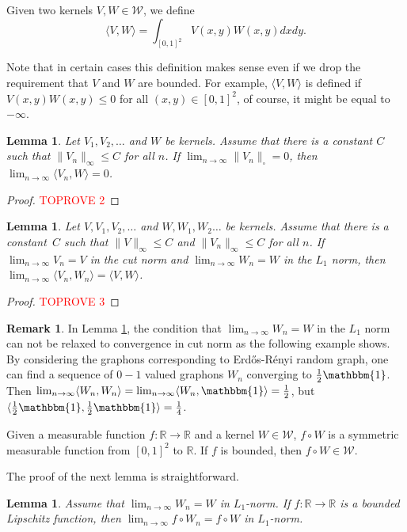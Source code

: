 \documentclass[11pt,a4paper]{article}
\theoremstyle{plain}
\newtheorem{lemma}[theorem]{Lemma}
\theoremstyle{definition}
\newtheorem{remark}[theorem]{Remark}
\begin{document}
Given two kernels $V,W\in\mathcal{W}$, we define
\[\langle V,W\rangle=\int_{[0,1]^2} V(x,y)W(x,y) dxdy.\]

Note that in certain cases this definition makes sense even if we drop the requirement that $V$ and $W$ are bounded. For example, $\langle V,W\rangle$ is defined if $V(x,y)W(x,y)\le 0$ for all $(x,y)\in [0,1]^2$, of course, it might be equal to $-\infty$.

\begin{lemma}\label{lemmaangle0}
    Let $V_1,V_2,\dots$ and $W$ be kernels. Assume that there is a constant $C$ such that   $\|V_n\|_\infty\le C$ for all $n$. If $\lim_{n\to\infty} \|V_n\|_\square=0$, then $\lim_{n\to\infty} \langle V_n,W\rangle =0$.
\end{lemma}
\begin{proof}\textcolor{red}{TOPROVE 2}\end{proof}


\begin{lemma}\label{lemmaangle}
    Let $V,V_1,V_2,\dots$ and $W,W_1,W_2\dots$ be kernels. Assume that there is a constant~$C$ such that $\|V\|_\infty\le C$ and   $\|V_n\|_\infty\le C$ for all $n$. If $\lim_{n\to\infty} V_n=V$ in the cut norm and $\lim_{n\to\infty} W_n=W$ in the $L_1$ norm, then $\lim_{n\to\infty} \langle V_n,W_n\rangle =\langle V,W\rangle$.
\end{lemma}
\begin{proof}\textcolor{red}{TOPROVE 3}\end{proof}
\begin{remark}
    In Lemma \ref{lemmaangle}, the condition that $\lim_{n\to\infty} W_n=W$ in the $L_1$ norm can not be relaxed to convergence in cut norm as the following example shows. By considering the graphons corresponding to Erd\H{o}s-R\'enyi random graph, one can find a sequence of $0-1$ valued graphons $W_n$ converging to $\frac{1}2\mathbbm{1}$. Then $\lim_{n\to\infty}\langle W_n,W_n\rangle=\lim_{n\to\infty}\langle W_n,\mathbbm{1}\rangle=\frac{1}2$, but $\langle \frac{1}2\mathbbm{1},\frac{1}2\mathbbm{1}\rangle=\frac{1}4$.
\end{remark}

Given a measurable function $f:\mathbb{R}\to\mathbb{R}$ and a kernel $W\in \mathcal{W}$, $f\circ W$ is a symmetric measurable function from $[0,1]^2$ to $\mathbb{R}$. If $f$ is bounded, then $f\circ W\in \mathcal{W}$.

The proof of the next lemma is straightforward.

\begin{lemma}\label{Lipschitz}
Assume that $\lim_{n\to\infty} W_n=W$ in $L_1$-norm. If $f:\mathbb{R}\to\mathbb{R}$ is a bounded Lipschitz function, then $\lim_{n\to\infty} f\circ W_n=f\circ W$ in $L_1$-norm. 
\end{lemma}
\end{document}
